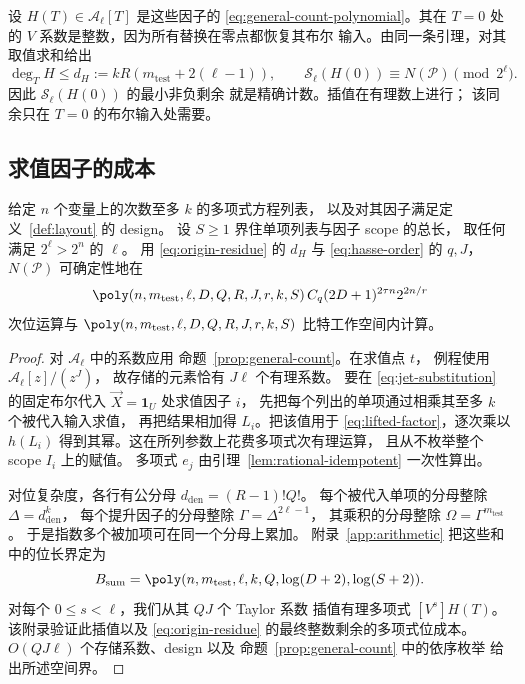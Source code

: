 设 $H(T)\in\mathcal A_\ell[T]$ 是这些因子的
\eqref{eq:general-count-polynomial}。其在 $T=0$
处的 $V$ 系数是整数，因为所有替换在零点都恢复其布尔
输入。由同一条引理，对其取值求和给出
\begin{equation}\label{eq:origin-residue}
 \deg_T H\le d_H:=kR(m_{\mathrm{test}}+2(\ell-1)),\qquad
 \mathcal S_\ell(H(0))\equiv N(\mathcal P)\pmod{2^\ell}.
\end{equation}
因此 $\mathcal S_\ell(H(0))$ 的最小非负剩余
就是精确计数。插值在有理数上进行；
该同余只在 $T=0$ 的布尔输入处需要。

\subsection{求值因子的成本}\label{subsec:one-query-cost}
\begin{proposition}\label{prop:count}
给定 $n$ 个变量上的次数至多 $k$ 的多项式方程列表，
以及对其因子满足定义~\ref{def:layout} 的 design。
设 $S\ge1$ 界住单项列表与因子 scope 的总长，
取任何满足 $2^\ell>2^n$ 的 $\ell$。
用 \eqref{eq:origin-residue} 的 $d_H$ 与
\eqref{eq:hasse-order} 的 $q,J$，
$N(\mathcal P)$ 可确定性地在
\[
 \poly(n,m_{\mathrm{test}},\ell,D,Q,R,J,r,k,S)\,
 C_q(2D+1)^{2\tau n}2^{2n/r}
\]
次位运算与 $\poly(n,m_{\mathrm{test}},\ell,D,Q,R,J,r,k,S)$
比特工作空间内计算。
\end{proposition}
\begin{proof}
对 $\mathcal A_\ell$ 中的系数应用
命题~\ref{prop:general-count}。在求值点 $t$，
例程使用 $\mathcal A_\ell[z]/(z^J)$，
故存储的元素恰有 $J\ell$ 个有理系数。
要在 \eqref{eq:jet-substitution} 的固定布尔代入
$\vec X=\mathbf1_U$ 处求值因子 $i$，
先把每个列出的单项通过相乘其至多 $k$ 个被代入输入求值，
再把结果相加得 $L_i$。把该值用于
\eqref{eq:lifted-factor}，逐次乘以 $h(L_i)$
得到其幂。这在所列参数上花费多项式次有理运算，
且从不枚举整个 scope $I_i$ 上的赋值。
多项式 $e_j$ 由引理~\ref{lem:rational-idempotent}
一次性算出。

对位复杂度，各行有公分母 $d_{\mathrm{den}}=(R-1)!Q!$。
每个被代入单项的分母整除 $\Delta=d_{\mathrm{den}}^k$，
每个提升因子的分母整除 $\Gamma=\Delta^{2\ell-1}$，
其乘积的分母整除 $\Omega=\Gamma^{m_{\mathrm{test}}}$。
于是指数多个被加项可在同一个分母上累加。
附录~\ref{app:arithmetic} 把这些和中的位长界定为
\begin{equation}\label{eq:sum-bit-bound}
 B_{\mathrm{sum}}=\poly(n,m_{\mathrm{test}},\ell,k,Q,\log(D+2),\log(S+2)).
\end{equation}
对每个 $0\le s<\ell$，我们从其 $QJ$ 个 Taylor 系数
插值有理多项式 $[V^s]H(T)$。
该附录验证此插值以及 \eqref{eq:origin-residue}
的最终整数剩余的多项式位成本。
$O(QJ\ell)$ 个存储系数、design 以及
命题~\ref{prop:general-count} 中的依序枚举
给出所述空间界。
\end{proof}


